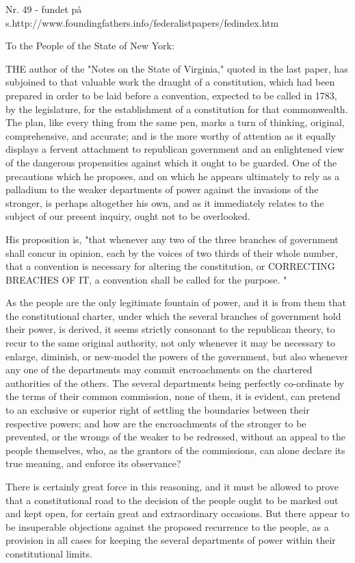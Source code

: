 Nr. 49 - fundet på s.http://www.foundingfathers.info/federalistpapers/fedindex.htm

To the People of the State of New York:

THE author of the "Notes on the State of Virginia," quoted in the last paper, has subjoined to that valuable work the draught of a constitution, which had been prepared in order to be laid before a convention, expected to be called in 1783, by the legislature, for the establishment of a constitution for that commonwealth. The plan, like every thing from the same pen, marks a turn of thinking, original, comprehensive, and accurate; and is the more worthy of attention as it equally displays a fervent attachment to republican government and an enlightened view of the dangerous propensities against which it ought to be guarded. One of the precautions which he proposes, and on which he appears ultimately to rely as a palladium to the weaker departments of power against the invasions of the stronger, is perhaps altogether his own, and as it immediately relates to the subject of our present inquiry, ought not to be overlooked.

His proposition is, "that whenever any two of the three branches of government shall concur in opinion, each by the voices of two thirds of their whole number, that a convention is necessary for altering the constitution, or CORRECTING BREACHES OF IT, a convention shall be called for the purpose. "

As the people are the only legitimate fountain of power, and it is from them that the constitutional charter, under which the several branches of government hold their power, is derived, it seems strictly consonant to the republican theory, to recur to the same original authority, not only whenever it may be necessary to enlarge, diminish, or new-model the powers of the government, but also whenever any one of the departments may commit encroachments on the chartered authorities of the others. The several departments being perfectly co-ordinate by the terms of their common commission, none of them, it is evident, can pretend to an exclusive or superior right of settling the boundaries between their respective powers; and how are the encroachments of the stronger to be prevented, or the wrongs of the weaker to be redressed, without an appeal to the people themselves, who, as the grantors of the commissions, can alone declare its true meaning, and enforce its observance?

There is certainly great force in this reasoning, and it must be allowed to prove that a constitutional road to the decision of the people ought to be marked out and kept open, for certain great and extraordinary occasions. But there appear to be insuperable objections against the proposed recurrence to the people, as a provision in all cases for keeping the several departments of power within their constitutional limits.

